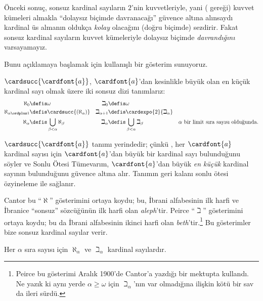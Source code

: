 



Önceki sonuç, sonsuz kardinal sayıların $2$'nin kuvvetleriyle, yani
( gereği) kuvvet kümeleri almakla
``dolaysız biçimde davranacağı'' güvence altına alınsaydı kardinal üs
almanın oldukça \emph{kolay} olacağını (doğru biçimde) sezdirir. Fakat
sonsuz kardinal sayıların kuvvet kümeleriyle dolaysız biçimde
\emph{davrandığını} varsayamayız.

Bunu açıklamaya başlamak için kullanışlı bir gösterim sunuyoruz.

\begin{defn}
$\cardsucc{\cardfont{a}}$, $\cardfont{a}$'dan kesinlikle büyük olan en
küçük kardinal sayı olmak üzere iki sonsuz dizi tanımlarız:
\begin{align*}
	\aleph_{0} &\defis \omega &
	\beth_{0} &\defis \omega\\
	\aleph_{\alpha \ordplus 1} &\defis \cardsucc{(\aleph_{\alpha})} &
	\beth_{\alpha+1} &\defis \cardexpo{2}{\beth_{\alpha}}\\
	\aleph_{\alpha} &\defis \bigcup_{\beta< \alpha} \aleph_{\beta} &
	\beth_{\alpha} &\defis \bigcup_{\beta < \alpha}\beth_{\beta} &
	\text{$\alpha$ bir limit sıra sayısı olduğunda}.
	\end{align*}
\end{defn}

$\cardsucc{\cardfont{a}}$ tanımı yerindedir; çünkü
, her
$\cardfont{a}$ kardinal sayısı için $\cardfont{a}$'dan büyük bir kardinal
sayı bulunduğunu söyler ve Sonlu Ötesi Tümevarım, $\cardfont{a}$'dan
büyük \emph{en küçük} kardinal sayının bulunduğunu güvence altına alır.
Tanımın geri kalanı sonlu ötesi özyineleme ile sağlanır.

Cantor bu ``$\aleph$'' gösterimini ortaya koydu; bu, İbrani alfabesinin
ilk harfi ve İbranice ``sonsuz'' sözcüğünün ilk harfi olan \emph{aleph}'tir.
Peirce ``$\beth$'' gösterimini ortaya koydu; bu da İbrani alfabesinin
ikinci harfi olan \emph{beth}'tir.\footnote{Peirce bu gösterimi Aralık
1900'de Cantor'a yazdığı bir mektupta kullandı. Ne yazık ki aynı yerde
$\alpha\geq\omega$ için $\beth_\alpha$'nın var olmadığına ilişkin kötü
bir sav da ileri sürdü.} Bu gösterimler bize sonsuz kardinal sayılar verir.

\begin{prop}
Her $\alpha$ sıra sayısı için $\aleph_\alpha$ ve $\beth_\alpha$ kardinal
sayılardır.
\end{prop}

